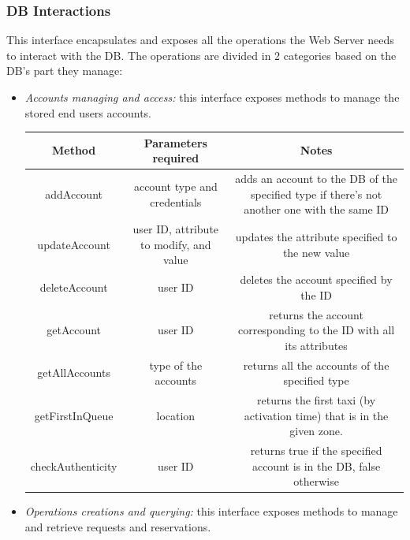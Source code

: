 \documentclass{article}
\begin{document}
	\subsubsection{DB Interactions}
	This interface encapsulates and exposes all the operations the Web Server needs to interact with the DB\@. The operations are divided in 2 categories based on the DB's part they manage:
	\begin{itemize}	
		\item \textit{Accounts managing and access:} this interface exposes methods to manage the stored end users accounts.\\	
			\begin{table}[H]
				\begin{adjustbox}{width=1.2\textwidth}
					\begin{tabular}{*{3}{c}}
						\toprule
						Method & Parameters required & Notes \\
						\midrule
						addAccount & account type and credentials & adds an account to the DB of the specified type if there's not another one with the same ID\\
						updateAccount & user ID, attribute to modify, and value & updates the attribute specified to the new value\\ 
						deleteAccount & user ID & deletes the account specified by the ID \\
						getAccount & user ID & returns the account corresponding to the ID with all its attributes \\
						getAllAccounts & type of the accounts & returns all the accounts of the specified type \\
						getFirstInQueue & location & returns the first taxi (by activation time) that is in the given zone.\\
						checkAuthenticity & user ID & returns true if the specified account is in the DB, false otherwise \\
						\bottomrule
					\end{tabular}	
				\end{adjustbox}
			\end{table}
		\item \textit{Operations creations and querying:} this interface exposes methods to manage and retrieve requests and reservations.\\	

\end{itemize}
\end{document}
